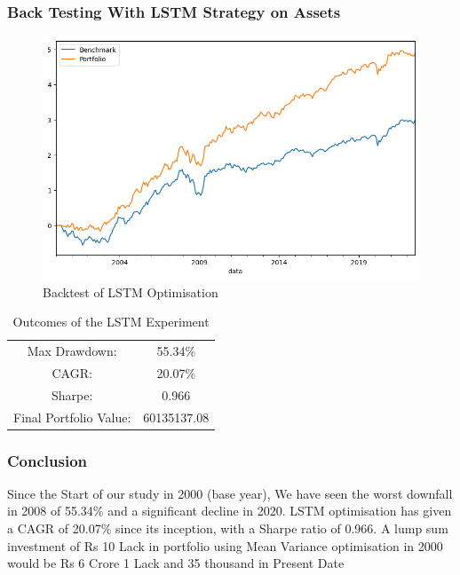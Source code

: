 \subsubsection{Back Testing With LSTM Strategy on Assets}

\begin{figure}[H]
\centering
   \includegraphics[width=1.0\textwidth]{LSTM/backtest.png}
      \caption{Backtest of LSTM Optimisation
}
       \label{LSTM_assets}
\end{figure}

\begin{table}[H]
\centering
\begin{tabular}{|c | c|} 
 \hline
 Max Drawdown: &55.34\%\\
CAGR: &20.07\%\\
Sharpe: &0.966\\
Final Portfolio Value: &60135137.08\\
 \hline
\end{tabular}
\caption{Outcomes of the LSTM Experiment}
\label{LSTM outcome table}
\end{table}
\subsubsection{Conclusion}
Since the Start of our study in 2000 (base year), We have seen the worst downfall in 2008 of 55.34\% and a significant decline in 2020. LSTM optimisation has given a CAGR of 20.07\% since its inception, with a Sharpe ratio of 0.966. A lump sum investment of Rs 10 Lack in portfolio using Mean Variance optimisation in 2000 would be Rs 6 Crore 1 Lack and 35 thousand in Present Date
